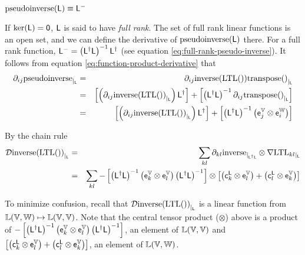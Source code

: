 $\mathrm{pseudoinverse}(\mathsf{L}) \equiv \mathsf{L}^{-}$

If $\mathrm{ker}(\mathsf{L}) = {\mathsf 0}$, $\mathsf{L}$ is said to have \textit{full rank}.
The set of full rank linear functions is an open set,
and we can define the derivative of $\mathrm{pseudoinverse}(\mathsf{L})$ there.
For a full rank function,
$\mathsf{L}^{-} = \left( \mathsf{L}^{\dagger} \mathsf{L} \right)^{-1} \mathsf{L}^{\dagger}$
(see equation \ref{eq:full-rank-pseudo-inverse}).
It follows from equation \ref{eq:function-product-derivative} that
\begin{eqnarray}
{\partial}_{ij}{\mathrm{pseudoinverse}}_{\mid_{\mathsf{L}}}
& = &
{\partial}_{ij}{\mathrm{inverse}(\mathrm{LTL}())\mathrm{transpose}()}_{\mid_{\mathsf{L}}}
\\
& = &
\left[
\left( {\partial}_{ij}{\mathrm{inverse}(\mathrm{LTL}())}_{\mid_{\mathsf{L}}} \right)
\mathsf{L}^{\dagger}
\right]
+
\left[
\left( \mathsf{L}^{\dagger} \mathsf{L} \right)^{-1}
{\partial}_{ij}{\mathrm{transpose}()}_{\mid_{\mathsf{L}}}
\right]
\nonumber
\\
& = &
\left[
\left( {\partial}_{ij}{\mathrm{inverse}(\mathrm{LTL}())}_{\mid_{\mathsf{L}}} \right)
\mathsf{L}^{\dagger}
\right]
+
\left[
\left( \mathsf{L}^{\dagger} \mathsf{L} \right)^{-1}
\left( \mathsf{e}_j^{\mathbb{V}} \otimes \mathsf{e}_i^{\mathbb{W}} \right)
\right]
\nonumber
\end{eqnarray}

By the chain rule
\begin{eqnarray}
{\mathcal{D}{\mathrm{inverse}(\mathrm{LTL}())}_{\mid_{\mathsf{L}}}}
& = &
\sum_{kl}
{\partial}_{kl}{\mathrm{inverse}}_{\mid_{\mathsf{L}^{\dagger}\mathsf{L}}}
\otimes
{\mathbf \nabla}{\mathrm{LTL}_{kl}}_{\mid_{\mathsf{L}}}
\\
& = &
\sum_{kl}
- \left[
\left( \mathsf{L}^{\dagger} \mathsf{L} \right)^{-1}
\left( \mathsf{e}_k^{\mathbb{V}} \otimes \mathsf{e}_l^{\mathbb{V}} \right)
\left( \mathsf{L}^{\dagger} \mathsf{L} \right)^{-1}
\right]
\otimes
\left[
\left( \mathsf{c}_k^{\mathsf{L}} \otimes \mathsf{e}_l^{\mathbb{V}} \right)
+
\left( \mathsf{c}_l^{\mathsf{L}} \otimes \mathsf{e}_k^{\mathbb{V}} \right)
\right]
\nonumber
\end{eqnarray}

To minimize confusion,
recall that ${\mathcal{D}{\mathrm{inverse}(\mathrm{LTL}())}_{\mid_{\mathsf{L}}}}$ is
a linear function from $\mathbb{L}(\mathbb{V},\mathbb{W}) \mapsto \mathbb{L}(\mathbb{V},\mathbb{V})$.
Note that the central tensor product ($\otimes$) above
is a product of
$
- \left[
\left( \mathsf{L}^{\dagger} \mathsf{L} \right)^{-1}
\left( \mathsf{e}_k^{\mathbb{V}} \otimes \mathsf{e}_l^{\mathbb{V}} \right)
\left( \mathsf{L}^{\dagger} \mathsf{L} \right)^{-1}
\right]
$,
an element of $\mathbb{L}(\mathbb{V},\mathbb{V})$
and
$
\left[
\left( \mathsf{c}_k^{\mathsf{L}} \otimes \mathsf{e}_l^{\mathbb{V}} \right)
+
\left( \mathsf{c}_l^{\mathsf{L}} \otimes \mathsf{e}_k^{\mathbb{V}} \right)
\right]
$,
an element of $\mathbb{L}(\mathbb{V},\mathbb{W})$.

